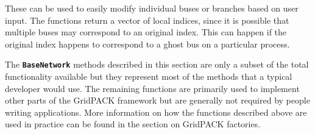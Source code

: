 These can be used to easily modify individual buses or branches based on user
input. The functions return a vector of local indices, since it is possible that
multiple buses may correspond to an original index. This can happen if the
original index happens to correspond to a ghost bus on a particular process.

The \texttt{\textbf{BaseNetwork}} methods described in this section are only a subset of the total functionality available but they represent most of the methods that a typical developer would use. The remaining functions are primarily used to implement other parts of the GridPACK framework but are generally not required by people writing applications. More information on how the functions described above are used in practice can be found in the section on GridPACK factories.
\newline
\hyperlink{topDoc}{\color{blue}{Top}}
